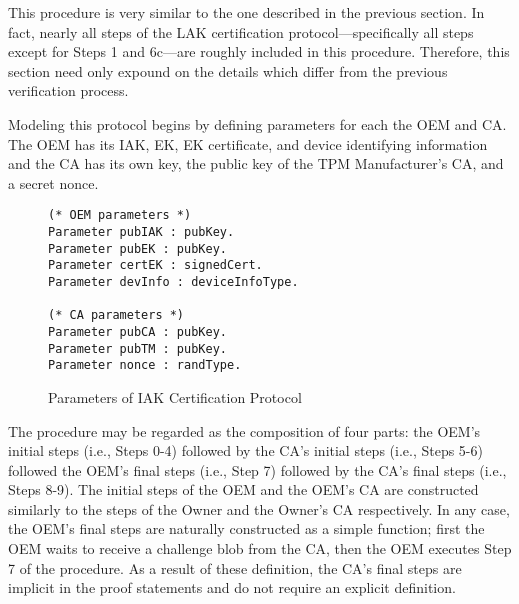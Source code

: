 This procedure is very similar to the one described in the previous section. In fact, nearly all steps of the LAK certification protocol---specifically all steps except for Steps 1 and 6c---are roughly included in this procedure. Therefore, this section need only expound on the details which differ from the previous verification process. 

Modeling this protocol begins by defining parameters for each the OEM and CA. The OEM has its IAK, EK, EK certificate, and device identifying information and the CA has its own key, the public key of the TPM Manufacturer's CA, and a secret nonce.
\begin{figure}[h]
\begin{lstlisting}[language=Coq]
(* OEM parameters *)
Parameter pubIAK : pubKey.
Parameter pubEK : pubKey.
Parameter certEK : signedCert.
Parameter devInfo : deviceInfoType.

(* CA parameters *)
Parameter pubCA : pubKey.
Parameter pubTM : pubKey.
Parameter nonce : randType.
\end{lstlisting}
\caption{Parameters of IAK Certification Protocol}
\end{figure}
The procedure may be regarded as the composition of four parts: the OEM's initial steps (i.e., Steps 0-4) followed by the CA's initial steps (i.e., Steps 5-6) followed the OEM's final steps (i.e., Step 7) followed by the CA's final steps (i.e., Steps 8-9). The initial steps of the OEM and the OEM's CA are constructed similarly to the steps of the Owner and the Owner's CA respectively. In any case, the OEM's final steps are naturally constructed as a simple function; first the OEM waits to receive a challenge blob from the CA, then the OEM executes Step 7 of the procedure. As a result of these definition, the CA's final steps are implicit in the proof statements and do not require an explicit definition. 

